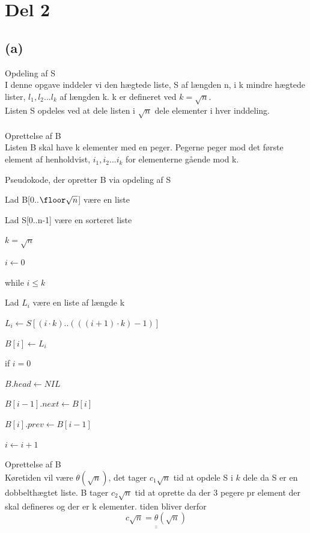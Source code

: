 \documentclass[a4paper,10pt]{article}
\begin{document}
\pagebreak
\section*{Del 2}
\subsection*{(a)}
\large
Opdeling af S\\
\normalsize
I denne opgave inddeler vi den hægtede liste, S af længden n, i k mindre hægtede lister, $l_1, l_2 ... l_k$ af længden k. k er defineret ved $k = \sqrt{n}$.\\ 
Listen S opdeles ved at dele listen i $\sqrt{n}$ dele elementer i hver inddeling.\\
\\
\large
Oprettelse af B \\
\normalsize
Listen B skal have k elementer med en peger. Pegerne peger mod det første element af henholdvist, $i_1, i_2 ... i_k$ for elementerne gående mod k.\\
\begin{algorithm}[H]
\caption{Pseudokode, der opretter B via opdeling af S}
\begin{algorithmic}[4]
\State \parbox[t]{.7\linewidth}{Lad B[0..$\floor\sqrt{n}$] være en liste}
\State \parbox[t]{.7\linewidth}{Lad S[0..n-1] være en sorteret liste}
\State \parbox[t]{.7\linewidth}{$k = \sqrt{n}$}
\State \parbox[t]{.7\linewidth}{$i \leftarrow 0$}
\State \parbox[t]{.7\linewidth}{while $i \leq k$}
\Indent
\State \parbox[t]{.7\linewidth}{Lad $L_{i}$ være en liste af længde k}
\State \parbox[t]{.7\linewidth}{$L_{i} \leftarrow S[(i\cdot k)..(((i+1)\cdot k)-1)]$}
\State \parbox[t]{.7\linewidth}{$B[i] \leftarrow L_{i}$}
\Indent
\State \parbox[t]{.7\linewidth}{if $i = 0$}
\State \parbox[t]{.7\linewidth}{$B.head \leftarrow NIL$}
\EndIndent
\State \parbox[t]{.7\linewidth}{$B[i-1].next \leftarrow B[i]$}
\State \parbox[t]{.7\linewidth}{$B[i].prev \leftarrow B[i-1]$}
\State \parbox[t]{.7\linewidth}{$i \leftarrow i + 1$}
\EndIndent
\EndFunction
\end{algorithmic}
\end{algorithm}
\large
Oprettelse af B \\
\normalsize
Køretiden vil være $\theta(\sqrt{n})$, det tager $c_1\sqrt{n}$ tid at opdele S i $k$ dele da S er en dobbelthægtet liste. B tager $c_2\sqrt{n}$ tid at oprette da der 3 pegere pr element der skal defineres og der er k elementer. tiden bliver derfor $$\underline{\underline{c\sqrt{n}=\theta(\sqrt{n})}}$$
\end{document}
